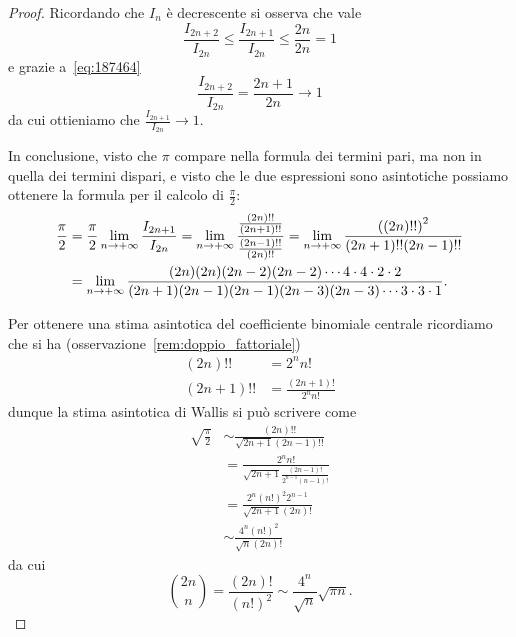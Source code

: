 \begin{proof}
Ricordando che $I_n$ è decrescente si osserva
che vale
\[
  \frac{I_{2n+2}}{I_{2n}}
  \le \frac{I_{2n+1}}{I_{2n}}
  \le \frac{2n}{2n} = 1
\]
e grazie a~\eqref{eq:187464}
\[
 \frac{I_{2n+2}}{I_{2n}}
 = \frac{2n+1}{2n} \to 1
\]
da cui ottieniamo che $\frac{I_{2n+1}}{I_{2n}}\to 1$.

In conclusione, visto che $\pi$ compare nella formula dei termini pari, ma
non in quella dei termini dispari, e visto che le due espressioni sono
asintotiche possiamo ottenere
la formula per il calcolo di $\frac \pi 2$:
\begin{align*}
\frac{\pi}{2}
&= \frac{\pi}{2} \lim_{n\to +\infty} \frac{I_{2n+1}}{I_{2n}}
= \lim_{n\to +\infty} \frac{\frac{(2n)!!}{(2n+1)!!}}{\frac{(2n-1)!!}{(2n)!!}}
= \lim_{n\to +\infty} \frac{{\left( (2n)!! \right)}^2}{(2n+1)!!(2n-1)!!} \\
&= \lim_{n\to +\infty} \frac{(2n)(2n)(2n-2)(2n-2) \cdots 4\cdot 4 \cdot 2 \cdot 2}
  {(2n+1)(2n-1)(2n-1)(2n-3)(2n-3)\cdots 3 \cdot 3 \cdot 1}.
\end{align*}

Per ottenere una stima asintotica del coefficiente binomiale centrale
ricordiamo che si ha (osservazione~\ref{rem:doppio_fattoriale})
\begin{align*}
  (2n)!! &= 2^n n! \\
  (2n+1)!! &= \frac{(2n+1)!}{2^n n!}
\end{align*}
dunque la stima asintotica di Wallis si può scrivere come
\begin{align*}
 \sqrt{\frac{\pi}{2}}
 &\sim \frac{(2n)!!}{\sqrt{2n+1}(2n-1)!!}\\
 &= \frac{2^n n!}{\sqrt{2n+1}\frac{(2n-1)!}{2^{n-1}(n-1)!}} \\
 &= \frac{2^n (n!)^2 2^{n-1}}{\sqrt{2n+1}(2n)!} \\
 &\sim \frac{4^n (n!)^2}{\sqrt{n}(2n)!}
\end{align*}
da cui
\[
{2n \choose n}
= \frac{(2n)!}{(n!)^2}
\sim \frac{4^n}{\sqrt{n}}\sqrt{\pi n}.
\]
\end{proof}

